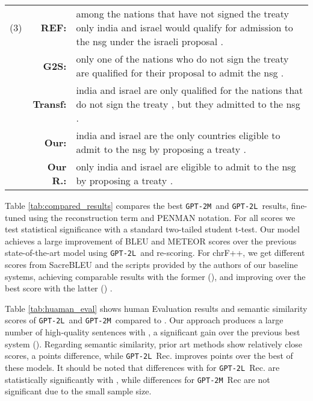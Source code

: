 \documentclass[11pt,a4paper]{article}
\newcommand{\GPTm}{\texttt{GPT-2M}}
\newcommand{\GPTl}{\texttt{GPT-2L}}
\begin{document}
\begin{table*}[ht!]
\begin{tabular}{c r p{13cm}}
         (3) & \bf REF:    & among the nations that have not signed the treaty only india and israel would qualify for admission to the nsg under the israeli proposal .\\
             & \bf G2S: & only one of the nations who do not sign the treaty are qualified for their proposal to admit the nsg .\\
             & \bf Transf:    & india and israel are only qualified for the nations that do not sign the treaty , but they admitted to the nsg .\\
             & \bf Our:    & india and israel are the only countries eligible to admit to the nsg by proposing a treaty .\\
             & \bf Our R.: & only india and israel are eligible to admit to the nsg by proposing a treaty .\\\hline
    \end{tabular}
    \caption{Output examples from four systems of the LDC2017T10 dataset. REF stands for reference, G2S for \citep{guo2019densely} and Transf. for \citep{zhu2019modeling}. Our is the top beam output for \GPTl~and Our R. is with re-scoring.}
    \label{tab:output_examples}
\end{table*}{}

Table \ref{tab:compared_results} compares the best \GPTm~and \GPTl~results, fine-tuned using the reconstruction term and PENMAN notation. For all scores we test statistical significance with a standard two-tailed student t-test. Our model achieves a large improvement of  BLEU and  METEOR scores over the previous state-of-the-art model using \GPTl~and re-scoring. For chrF++, we get different scores from SacreBLEU and the scripts provided by the authors of our baseline systems, achieving comparable results with the former (), and improving over the best score with the latter () . 

Table \ref{tab:huaman_eval} shows human Evaluation results and semantic similarity scores of \GPTl~and \GPTm~compared to \cite{zhu2019modeling,ribeiro2019enhancing,guo2019densely}. Our approach produces a large number of high-quality sentences with , a significant gain over the previous best system (). Regarding semantic similarity, prior art methods show relatively close scores, a  points difference, while \GPTl~Rec. improves  points over the best of these models. It should be noted that differences with \cite{zhu2019modeling} for \GPTl~Rec. are statistically significantly with , while differences for \GPTm~Rec are not significant due to the small sample size. 
\end{document}
